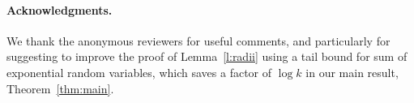 \documentclass[twoside,leqno,twocolumn]{article}
\begin{document}
\fi

\paragraph{Acknowledgments.}
We thank the anonymous reviewers for useful comments, 
and particularly for suggesting to improve the proof of Lemma~\ref{l:radii}
using a tail bound for sum of exponential random variables, 
which saves a factor of $\log k$ in our main result, Theorem~\ref{thm:main}.




\end{document}
